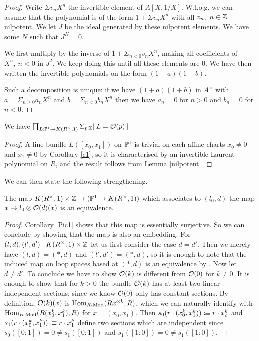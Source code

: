 \begin{proof}
  Write $\Sigma v_nX^n$ the invertible element of $A[X,1/X]$.
  W.l.o.g. we can assume that the polynomial is of the form $1 + \Sigma v_nX^n$ with
  all $v_n,~n\in \mathbb{Z}$ nilpotent.
  We let $J$ be the ideal generated by these nilpotent elements.
  We have some $N$ such that $J^N = 0$.
  
  We first multiply by the inverse of $1 + \Sigma_{n<0}v_nX^n$, making all coefficients of
  $X^n,~n<0$ in $J^2$.
  We keep doing this until all these elements are $0$.
  We have then written the invertible polynomials on the form $(1+a)(1+b)$.

  Such a decomposition is unique: if we have $(1+a)(1+b)$ in $A^{\times}$ with $a = \Sigma_{n\geqslant 0}a_nX^n$
  and $b = \Sigma_{n<0}b_nX^n$ then we have $a_n = 0$ for $n>0$ and $b_n = 0$ for $n<0$.
\end{proof}

\begin{corollary}\label{Pic1}
  We have $\prod_{L:\mathbb{P}^1\rightarrow K(R^{\times},1)}\Sigma_{p:\mathbb{Z}}\|L = \mathcal{O}(p)\|$
\end{corollary}

\begin{proof}
A line bundle $L([x_0,x_1])$ on $\mathbb{P}^1$ is trivial on each affine charts $x_0\neq 0$ and $x_1\neq 0$ by Corollary \ref{c1}, so
it is characterised by an invertible Laurent polynomial on $R$, and the result follows from Lemma \ref{nilpotent}.
\end{proof}

We can then state the following strengthening.

\begin{proposition}\label{Matthias}
  The map $K(R^{\times},1)\times\mathbb{Z}\rightarrow (\mathbb{P}^1\rightarrow K(R^{\times},1))$
  which associates to $(l_0,d)$ the map $x\mapsto l_0\otimes \mathcal{O}(d)(x)$ is an equivalence.
\end{proposition}

\begin{proof}
  Corollary \ref{Pic1} shows that this map is essentially surjective.
  So we can conclude by showing that the map is also an embedding.
  For $(l,d),(l',d'):K(R^{\times},1)\times\mathbb{Z}$ let us first consider the case $d=d'$. 
  Then we merely have $(l,d)=(\ast,d)$ and $(l',d')=(\ast,d)$,
  so it is enough to note that the induced map on loop spaces based at $(\ast,d)$ is an equivalence by .
  Now let $d\neq d'$. To conclude we have to show $\mathcal{O}(k)$ is different from $\mathcal{O}(0)$ for $k\neq 0$.
  It is enough to show that for $k>0$ the bundle $\mathcal{O}(k)$ has at least two linear independent sections, since we know $\mathcal{O}(0)$ only has constant sections.
  By definition, $\mathcal{O}(k)(x)$ is $\mathrm{Hom}_{R\text{-}\mathrm{Mod}}(Rx^{\otimes k},R)$, which we can naturally identify with $\mathrm{Hom}_{R\text{-}\mathrm{Mod}}(R(x_0^k,x_1^k),R)$ for $x=(x_0,x_1)$.
  Then $s_0(r\cdot (x_0^k,x_1^k))\vcentcolon\mspace{-1.2mu}\equiv r\cdot x_o^k$ and $s_1(r\cdot (x_0^k,x_1^k))\vcentcolon\mspace{-1.2mu}\equiv r\cdot x_1^k$ define two sections
  which are independent since $s_0([0:1])=0\neq s_1([0:1])$ and $s_1([1:0])=0\neq s_1([1:0])$.
\end{proof}

